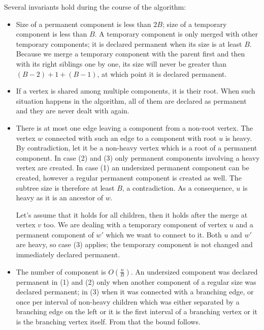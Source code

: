 Several invariants hold during the course of the algorithm:
\begin{itemize}
	\item Size of a permanent component is less than $2 B$; size of a temporary component is less than $B$.
	A temporary component is only merged with other temporary components; it is declared permanent when its size is at least $B$.
	Because we merge a temporary component with the parent first and then with its right siblings one by one, its size will never be greater than $(B - 2) + 1 + (B - 1)$, at which point it is declared permanent.
	\item If a vertex is shared among multiple components, it is their root.
	When such situation happens in the algorithm, all of them are declared as permanent and they are never dealt with again.
	\item There is at most one edge leaving a component from a non-root vertex.
	The vertex $w$ connected with such an edge to a component with root $u$ is heavy.
	By contradiction, let it be a non-heavy vertex which is a root of a permanent component.
	In case (2) and (3) only permanent components involving a heavy vertex are created.
	In case (1) an undersized permanent component can be created, however a regular permanent component is created as well.
	The subtree size is therefore at least $B$, a contradiction.
	As a consequence, $u$ is heavy as it is an ancestor of $w$.
	
	Let's assume that it holds for all children, then it holds after the merge at vertex $v$ too.
	We are dealing with a temporary component of vertex $u$ and a permanent component of $w'$ which we want to connect to it.
	Both $u$ and $w'$ are heavy, so case (3) applies; the temporary component is not changed and immediately declared permanent.
	\item The number of component is $O\left(\frac{n}{B}\right)$.
	An undersized component was declared permanent in (1) and (2) only when another component of a regular size was declared permanent; in (3) when it was connected with a branching edge, or once per interval of non-heavy children which was either separated by a branching edge on the left or it is the first interval of a branching vertex or it is the branching vertex itself.
	From that the bound follows.
\end{itemize}

